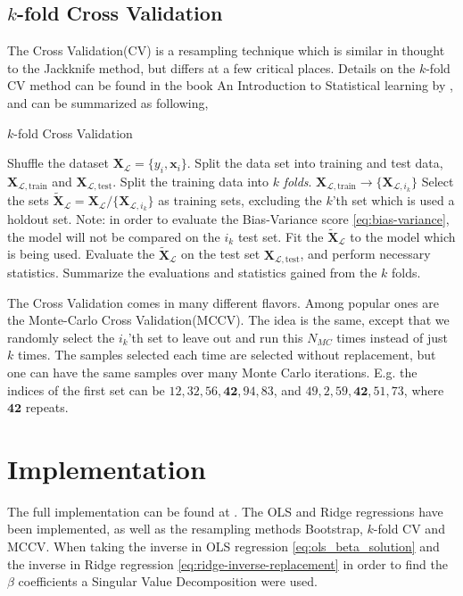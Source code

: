 \documentclass[11pt]{article}
\begin{document}
\subsection{\texorpdfstring{$k$}{k}-fold Cross Validation}
The Cross Validation(CV) is a resampling technique which is similar in thought to the Jackknife method, but differs at a few critical places. Details on the $k$-fold CV method can be found in the book An Introduction to Statistical learning by \citet[ch. 5.1]{james2013introduction}, and can be summarized as following,
\begin{algorithm}[H]
    \caption{$k$-fold Cross Validation}
    \label{alg:kfcv}
    \begin{algorithmic}[1]
        \State Shuffle the dataset $\bm{X}_\mathcal{L}=\{y_i,\bm{x}_i\}$.
        \State Split the data set into training and test data, $\bm{X}_{\mathcal{L},\mathrm{train}}$ and $\bm{X}_{\mathcal{L},\mathrm{test}}$.
        \State Split the training data into $k$ \textit{folds}. $\bm{X}_{\mathcal{L},\mathrm{train}}\rightarrow \{\bm{X}_{\mathcal{L},i_k}\}$
            \State Select the sets $\tilde{\bm{X}}_{\mathcal{L}} = \bm{X}_{\mathcal{L}} / \{\bm{X}_{\mathcal{L},i_k}\}$ as training sets, excluding the $k$'th set which is used a holdout set. Note: in order to evaluate the Bias-Variance score \eqref{eq:bias-variance}, the model will not be compared on the $i_k$ test set.
            \State Fit the $\tilde{\bm{X}}_{\mathcal{L}}$ to the model which is being used.
            \State Evaluate the $\tilde{\bm{X}}_{\mathcal{L}}$ on the test set $\bm{X}_{\mathcal{L},\mathrm{test}}$, and perform necessary statistics.
        \EndFor
        \State Summarize the evaluations and statistics gained from the $k$ folds.
    \end{algorithmic}
\end{algorithm}

The Cross Validation comes in many different flavors. Among popular ones are the Monte-Carlo Cross Validation(MCCV). The idea is the same, except that we randomly select the $i_k$'th set to leave out and run this $N_{MC}$ times instead of just $k$ times. The samples selected each time are selected without replacement, but one can have the same samples over many Monte Carlo iterations. E.g. the indices of the first set can be $12, 32, 56, \bm{42}, 94, 83$, and $49, 2, 59, \bm{42}, 51, 73$, where $\bm{42}$ repeats.

\section{Implementation}
The full implementation can be found at \cite{github-repo}. The OLS and Ridge regressions have been implemented, as well as the resampling methods Bootstrap, $k$-fold CV and MCCV. When taking the inverse in OLS regression \eqref{eq:ols_beta_solution} and the inverse in Ridge regression \eqref{eq:ridge-inverse-replacement} in order to find the $\beta$ coefficients a Singular Value Decomposition were used. 
\end{document}
